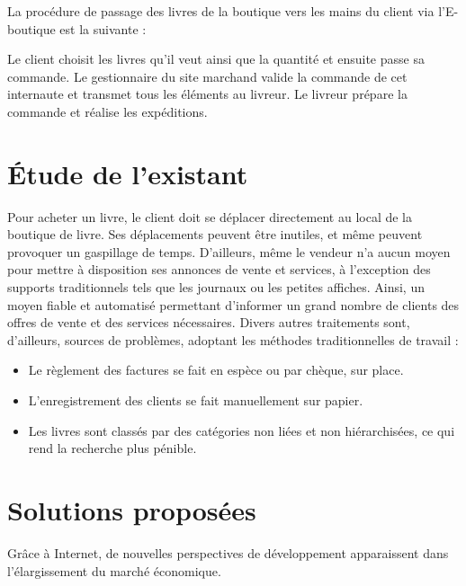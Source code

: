 La procédure de passage des livres de la boutique vers les mains du client via l'E-boutique est la suivante :

Le client choisit les livres qu'il veut ainsi que la quantité et ensuite passe sa commande.
Le gestionnaire du site marchand valide la commande de cet internaute et transmet tous les éléments au livreur. 
Le livreur prépare la commande et réalise les expéditions.

\newpage

\section{Étude de l'existant}

Pour acheter un livre, le client doit se déplacer directement au local de la boutique de livre. Ses déplacements peuvent être inutiles, et même peuvent provoquer un gaspillage de temps. D’ailleurs, même le vendeur n’a aucun moyen pour mettre à disposition ses annonces de vente et services, à l’exception des supports traditionnels tels que les journaux ou les petites affiches. Ainsi, un moyen fiable et automatisé permettant d’informer un grand nombre de clients des offres de vente et des services nécessaires. Divers autres traitements sont, d’ailleurs, sources de problèmes, adoptant les méthodes traditionnelles de travail :

\begin{itemize}
\item Le règlement des factures se fait en espèce ou par chèque, sur place. 
\item L’enregistrement des clients se fait manuellement sur papier. 
\item Les livres sont classés par des catégories non liées et non hiérarchisées, ce qui rend la recherche plus pénible.
\end{itemize}



\section{Solutions proposées}

Grâce à Internet, de nouvelles perspectives de développement apparaissent dans l'élargissement du marché économique.

